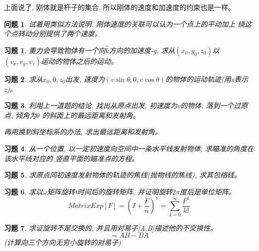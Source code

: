 \documentclass{ctexart}
\numberwithin{equation}{subsection}
\numberwithin{theorem}{subsection}
\numberwithin{definition}{subsection}
\numberwithin{proof}{subsection}
\numberwithin{lemma}{subsection}
\numberwithin{example}{subsection}
\numberwithin{remark}{subsection}
\numberwithin{corollary}{subsection}
\numberwithin{exercise}{subsection}
\newtheorem{problem}    {问题}
\numberwithin{problem}{subsection}
\newtheorem{question}   {习题}
\numberwithin{question}{section}
\numberwithin{method}{subsection}
\begin{document}
    上面说了, 刚体就是杆子的集合, 所以刚体的速度和加速度的约束也是一样。

    \begin{problem}
        \label{1.4 pb:rigid problem}
        试着用类似方法说明, 刚体速度的关联可以认为一个点上的平动加上
        绕这个点转动分别提供了两个速度。
    \end{problem}
    \begin{question}
        重力会导致物体有一个向\(\hat{k}\)方向的加速度-g, 求从\((x_0,y_0,z_0)\)以
        \((v_x,v_y,v_z)\)运动的物体之后的运动。
    \end{question}

    \begin{question}
        求从\(x_0,0,z_0\)出发, 速度为\((v \sin \theta,0,v \cos \theta)\)的物体的运动轨迹(用x表示z)。
    \end{question}

    \begin{question}
        利用上一道题的结论, 找出从原点出发, 初速度为v的物体, 落到一个过原点, 倾角为\(\theta\)
        的斜面上的最远距离和发射角。
        
        再用换到斜坐标系的办法, 求出最远距离和发射角。
    \end{question}

    \begin{question}
        从一个位置, 以一定初速度向空间中一条水平线发射物体, 求瞄准的角度在该水平线对应的
        竖直平面的瞄准点的方程。
    \end{question}

    \begin{question}
        求原点同初速度发射物体的轨迹的焦线(抛物线的焦线), 求其包络线。
    \end{question}

    \begin{question}
        求以\(\omega\)矩阵旋转t时间后的旋转矩阵, 并证明旋转\(2\pi\)度后是单位矩阵。
        \begin{equation}
            MatrixExp[F] = (I+\frac{F}{n})^n = \sum_{k=0}^\infty \frac{F^k}{k!}
        \end{equation}
    \end{question}

    \begin{question}
        求证旋转不是交换的, 并且用对易子[A,B]描述他的不交换性。
        \begin{equation}
            [A,B] = AB - BA
        \end{equation}
        (计算向三个方向无穷小旋转的对易子)
    \end{question}
\end{document}
